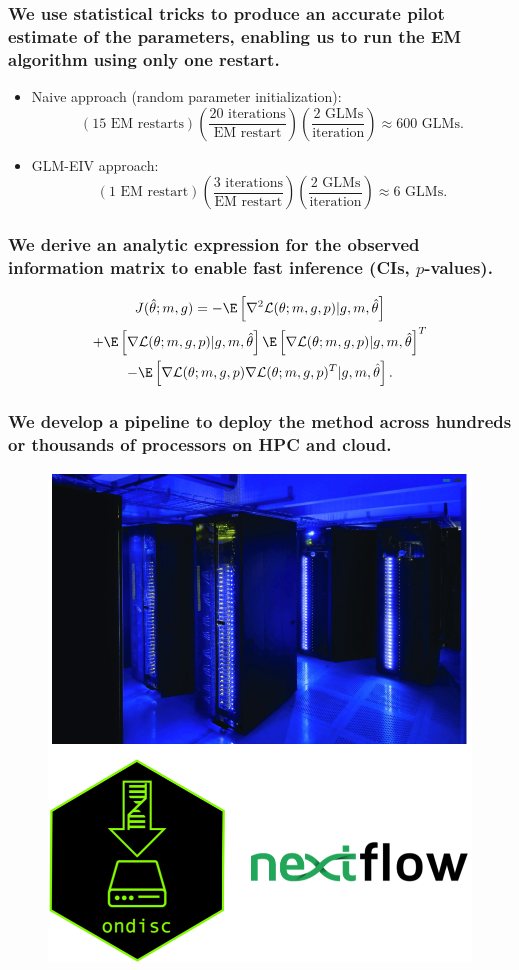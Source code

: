 \documentclass{beamer}
\begin{document}
\begin{frame}
\frametitle{We use statistical tricks to produce an accurate pilot estimate of the parameters, enabling us to run the EM algorithm using only one restart.}
\begin{itemize}
\item Naive approach (random parameter initialization): $$\left( \textrm{15 EM restarts} \right) \left( \frac{ \textrm{20 iterations} }{\textrm{EM restart}} \right) \left( \frac{\textrm{2 GLMs}}{\textrm{iteration}}\right) \approx \textrm{600 GLMs}.$$
\item GLM-EIV approach: 
$$ \left(\textrm{1 EM restart}\right) \left( \frac{ \textrm{3 iterations}}{\textrm{EM restart}} \right)\left( \frac{ \textrm{2 GLMs} }{ \textrm{iteration} } \right) \approx \textrm{6 GLMs}.$$
\end{itemize}
\end{frame}


\begin{frame}
\frametitle{We derive an analytic expression for the observed information matrix to enable fast inference (CIs, $p$-values).}
\begin{multline*}
J(\hat{\theta}; m, g) = -\E \left[\nabla^2 \mathcal{L}(\theta; m, g, p) | g, m, \hat{\theta} \right] \\ + \E\left[ \nabla \mathcal{L}(\theta; m, g, p) |  g, m, \hat{\theta} \right] \E\left[ \nabla \mathcal{L}(\theta; m, g, p) | g, m, \hat{\theta}\right]^T \\ - \E\left[ \nabla\mathcal{L}(\theta; m, g, p) \nabla \mathcal{L}(\theta; m, g, p)^T | g, m, \hat{\theta} \right].
\end{multline*}
\end{frame}

\begin{frame}
\frametitle{We develop a pipeline to deploy the method across hundreds or thousands of processors on HPC and cloud.}

\begin{figure}
\centering
\includegraphics[width=0.6\linewidth]{extra_figs/computing}
\end{figure}
\end{frame}
\end{document}
